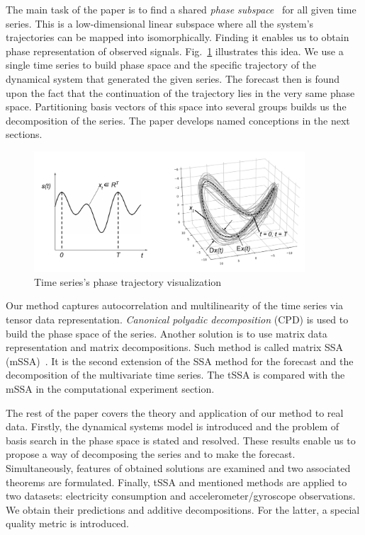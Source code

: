 \documentclass[referee, pdflatex, sn-mathphys-num]{sn-jnl}
\theoremstyle{definition}
\theoremstyle{plain}
\begin{document}
	The main task of the paper is to find a shared \emph{phase subspace}~\cite{1572261550523548160, ignatov2016human} for all given time series. This is a low-dimensional linear subspace where all the system's trajectories can be mapped into isomorphically. Finding it enables us to obtain phase representation of observed signals. Fig.~\ref{pic:phase_traj} illustrates this idea. We use a single time series to build phase space and the specific trajectory of the dynamical system that generated the given series. The forecast then is found upon the fact that the continuation of the trajectory lies in the very same phase space. Partitioning basis vectors of this space into several groups builds us the decomposition of the series. The paper develops named conceptions in the next sections.
	
	\begin{figure}[h]
		\centering
		\includegraphics[width=0.9\textwidth, keepaspectratio]{phase_traj.png}
		\caption{Time series's phase trajectory visualization }\label{pic:phase_traj}
	\end{figure}
	
	Our method captures autocorrelation and multilinearity of the time series via tensor data representation. \emph{Canonical polyadic decomposition} (CPD) is used to build the phase space of the series. Another solution is to use matrix data representation and matrix decompositions. Such method is called matrix SSA (mSSA)~\cite{mSSA_overview}. It is the second extension of the SSA method for the forecast and the decomposition of the multivariate time series. The tSSA is compared with the mSSA in the computational experiment section.
	
	The rest of the paper covers the theory and application of our method to real data. Firstly, the dynamical systems model is introduced and the problem of basis search in the phase space is stated and resolved. These results enable us to propose a way of decomposing the series and to make the forecast. Simultaneously, features of obtained solutions are examined and two associated theorems are formulated. Finally, tSSA and mentioned methods are applied to two datasets: electricity consumption and accelerometer/gyroscope observations. We obtain their predictions and additive decompositions. For the latter, a special quality metric is introduced.
	
\end{document}
